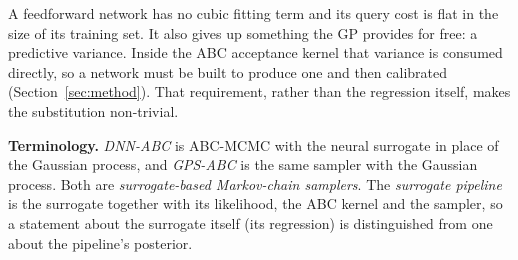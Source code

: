 \documentclass[sn-basic,iicol,pdflatex]{sn-jnl}
\begin{document}
A feedforward network has no cubic fitting term and its query cost is flat in
the size of its training set. It also gives up something the GP provides for
free: a predictive variance. Inside the ABC acceptance kernel that variance is
consumed directly, so a network must be built to produce one and then calibrated
(Section~\ref{sec:method}). That requirement, rather than the regression
itself, makes the substitution non-trivial.

\noindent\textbf{Terminology.} \emph{DNN-ABC} is ABC-MCMC with the neural surrogate in place of the Gaussian process, and \emph{GPS-ABC} is the same sampler with the Gaussian process. Both are \emph{surrogate-based Markov-chain samplers}. The \emph{surrogate pipeline} is the surrogate together with its likelihood, the ABC kernel and the sampler, so a statement about the surrogate itself (its regression) is distinguished from one about the pipeline's posterior.
\end{document}

